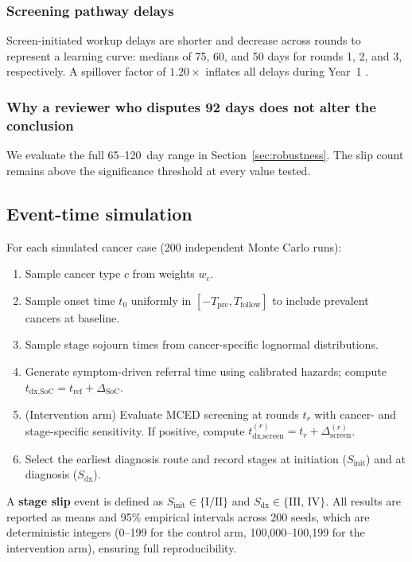 \documentclass[11pt,letter]{article}
\begin{document}
\subsubsection{Screening pathway delays}

Screen-initiated workup delays are shorter and decrease across rounds to
represent a learning curve: medians of 75, 60, and 50 days for rounds 1,
2, and 3, respectively. A spillover factor of $1.20\times$ inflates all
delays during Year~1 \cite{Mann2025}.

\subsubsection{Why a reviewer who disputes 92 days does not alter the conclusion}

We evaluate the full 65--120~day range in Section~\ref{sec:robustness}.
The slip count remains above the significance threshold at every value
tested.


\subsection{Event-time simulation}
\label{sec:simulation}

For each simulated cancer case (200 independent Monte Carlo runs):
\begin{enumerate}[nosep]
\item Sample cancer type $c$ from weights $w_c$.
\item Sample onset time $t_0$ uniformly in $[-T_{\text{pre}},
  T_{\text{follow}}]$ to include prevalent cancers at baseline.
\item Sample stage sojourn times from cancer-specific lognormal
  distributions.
\item Generate symptom-driven referral time using calibrated hazards;
  compute $t_{\text{dx,SoC}} = t_{\text{ref}} + \Delta_{\text{SoC}}$.
\item (Intervention arm) Evaluate MCED screening at rounds $t_r$ with
  cancer- and stage-specific sensitivity. If positive, compute
  $t_{\text{dx,screen}}^{(r)} = t_r + \Delta_{\text{screen}}^{(r)}$.
\item Select the earliest diagnosis route and record stages at initiation
  ($S_{\text{init}}$) and at diagnosis ($S_{\text{dx}}$).
\end{enumerate}

\noindent A \textbf{stage slip} event is defined as $S_{\text{init}} \in
\{\text{I/II}\}$ and $S_{\text{dx}} \in \{\text{III, IV}\}$. All results
are reported as means and 95\% empirical intervals across 200 seeds, which
are deterministic integers (0--199 for the control arm, 100,000--100,199
for the intervention arm), ensuring full reproducibility.
\end{document}
